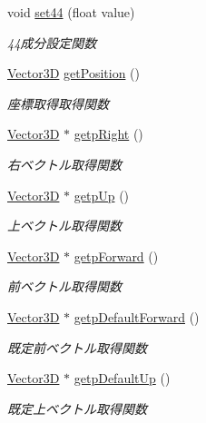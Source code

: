 \begin{DoxyCompactItemize}
void \mbox{\hyperlink{class_matrix_a1cea9dbd57d0ad3583243af3559917ad}{set44}} (float value)
\begin{DoxyCompactList}\small\item\em 44成分設定関数 \end{DoxyCompactList}\item 
\mbox{\hyperlink{class_vector3_d}{Vector3D}} \mbox{\hyperlink{class_matrix_af715d6df123065b56f602ea7db05238d}{get\+Position}} ()
\begin{DoxyCompactList}\small\item\em 座標取得取得関数 \end{DoxyCompactList}\item 
\mbox{\hyperlink{class_vector3_d}{Vector3D}} $\ast$ \mbox{\hyperlink{class_matrix_a8872d3d34f938dd920cfd2e81a33c9cb}{getp\+Right}} ()
\begin{DoxyCompactList}\small\item\em 右ベクトル取得関数 \end{DoxyCompactList}\item 
\mbox{\hyperlink{class_vector3_d}{Vector3D}} $\ast$ \mbox{\hyperlink{class_matrix_aed95f652a1365e3bb908c2ea07ed7884}{getp\+Up}} ()
\begin{DoxyCompactList}\small\item\em 上ベクトル取得関数 \end{DoxyCompactList}\item 
\mbox{\hyperlink{class_vector3_d}{Vector3D}} $\ast$ \mbox{\hyperlink{class_matrix_a384555a3c303692932b15eef7b3abf3e}{getp\+Forward}} ()
\begin{DoxyCompactList}\small\item\em 前ベクトル取得関数 \end{DoxyCompactList}\item 
\mbox{\hyperlink{class_vector3_d}{Vector3D}} $\ast$ \mbox{\hyperlink{class_matrix_a8b8b21659e1239a4a5b4361bc72f1fad}{getp\+Default\+Forward}} ()
\begin{DoxyCompactList}\small\item\em 既定前ベクトル取得関数 \end{DoxyCompactList}\item 
\mbox{\hyperlink{class_vector3_d}{Vector3D}} $\ast$ \mbox{\hyperlink{class_matrix_a34bf031354bde8182be09f1b7805a320}{getp\+Default\+Up}} ()
\begin{DoxyCompactList}\small\item\em 既定上ベクトル取得関数 \end{DoxyCompactList}\item 

\end{DoxyCompactItemize}
